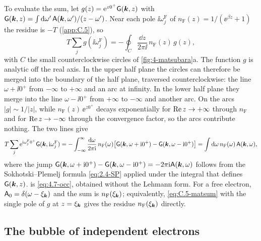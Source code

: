 To evaluate the sum, let $g(z) = \mathrm{e}^{z0^+}\mathsf{G}(\bm{k},z)$ with $\mathsf{G}(\bm{k},z) = \int\mathrm{d}\omega'\,\mathsf{A}(\bm{k},\omega')/(z - \omega')$. Near each pole $\ii\omega^{\mathrm{F}}_j$ of $n_{\mathrm{F}}(z) = 1/(\ee^{\beta z} + 1)$ the residue is $-T$ (\cref{app:C.5}), so
\begin{equation*}
  T\sum_j g(\ii\omega^{\mathrm{F}}_j) = -\oint_{C}\frac{\dd z}{2\pi\ii}\,n_{\mathrm{F}}(z)\,g(z) ,
\end{equation*}
with $C$ the small counterclockwise circles of \cref{fig:4-matsubara}a. The function $g$ is analytic off the real axis. In the upper half plane the circles can therefore be merged into the boundary of the half plane, traversed counterclockwise: the line $\omega + \ii0^+$ from $-\infty$ to $+\infty$ and an arc at infinity. In the lower half plane they merge into the line $\omega - \ii0^+$ from $+\infty$ to $-\infty$ and another arc. On the arcs $|g| \sim 1/|z|$, while $n_{\mathrm{F}}(z)\,\ee^{z0^+}$ decays exponentially for $\operatorname{Re} z \to +\infty$ through $n_{\mathrm{F}}$ and for $\operatorname{Re} z \to -\infty$ through the convergence factor, so the arcs contribute nothing. The two lines give
\begin{equation}
  T\sum_j\mathrm{e}^{\mathrm{i}\omega^{\mathrm{F}}_j0^+}\mathsf{G}(\bm{k},\mathrm{i}\omega^{\mathrm{F}}_j) = -\int_{-\infty}^{\infty}\frac{\mathrm{d}\omega}{2\pi\mathrm{i}}\,n_{\mathrm{F}}(\omega)\bigl[\mathsf{G}(\bm{k},\omega + \mathrm{i}0^+) - \mathsf{G}(\bm{k},\omega - \mathrm{i}0^+)\bigr]
  = \int\mathrm{d}\omega\,n_{\mathrm{F}}(\omega)\,\mathsf{A}(\bm{k},\omega) ,
  \label{eq:D.10-occ}
\end{equation}
where the jump $\mathsf{G}(\bm{k},\omega + \mathrm{i}0^+) - \mathsf{G}(\bm{k},\omega - \mathrm{i}0^+) = -2\pi\mathrm{i}\mathsf{A}(\bm{k},\omega)$ follows from the Sokhotski--Plemelj formula \cref{eq:2.4-SP} applied under the integral that defines $\mathsf{G}(\bm{k},z)$.  is \cref{eq:4.7-occ}, obtained without the Lehmann form. For a free electron, $\mathsf{A}_0 = \delta(\omega - \xi_{\bm{k}})$ and the sum is $n_{\mathrm{F}}(\xi_{\bm{k}})$; equivalently, \cref{eq:C.5-matsum} with the single pole of $g$ at $z = \xi_{\bm{k}}$ gives the residue $n_{\mathrm{F}}(\xi_{\bm{k}})$ directly.

\subsection*{The bubble of independent electrons}

